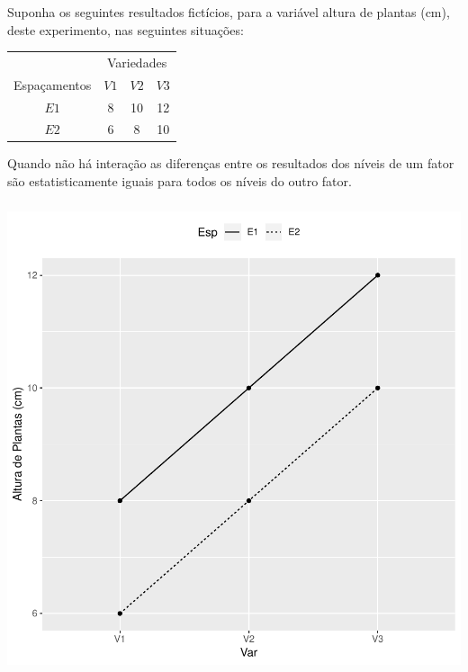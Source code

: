 \documentclass[14pt,aspectratio=1610]{beamer}
\begin{document}
\begin{frame}{}
\frametitle{}
\begin{block}{}
\justifying
Suponha os seguintes resultados fictícios, para a variável altura de
plantas (cm), deste experimento, nas seguintes situações:
\begin{table}[!h]
\begin{tabular}{cccc}
\hline
&\multicolumn{3}{c}{Variedades}\\
\cline{2-4}
Espaçamentos&$V1$&$V2$&$V3$\\
\hline
$E1$&8&10&12\\
$E2$&6&8 &10\\
\hline
\end{tabular}
\end{table}
Quando não há interação as diferenças entre os resultados dos níveis de
um fator são estatisticamente iguais para todos os níveis do outro fator.
\end{block}
\end{frame}

\begin{frame}{}
\frametitle{}
\begin{block}{}
\begin{center}
\includegraphics{Aula15-001}
\end{center}
\end{block}
\end{frame}
\end{document}
